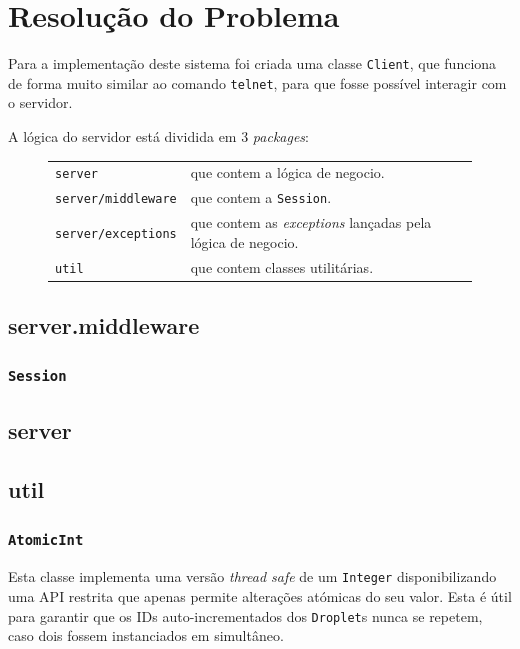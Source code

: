 \documentclass[a4paper]{article}
\begin{document}
\pagebreak
\section{Resolução do Problema}

Para a implementação deste sistema foi criada uma classe \texttt{Client}, que funciona de forma muito similar ao comando \texttt{telnet}, para que fosse possível interagir com o servidor.

A lógica do servidor está dividida em 3 \textit{packages}:

\begin{figure}[H]
    \begin{tabular}{ll}
        \texttt{server}            & que contem a lógica de negocio.\\
        \texttt{server/middleware} & que contem a \texttt{Session}.\\
        \texttt{server/exceptions} & que contem as \textit{exceptions} lançadas pela lógica de negocio.\\
        \texttt{util}              & que contem classes utilitárias.
    \end{tabular}
\end{figure}

\subsection{server.middleware}
\subsubsection{\texttt{Session}}


\subsection{server}


\subsection{util}
\subsubsection{\texttt{AtomicInt}}

Esta classe implementa uma versão \textit{thread safe} de um \texttt{Integer} disponibilizando uma API restrita que apenas permite alterações atómicas do seu valor. Esta é útil para garantir que os IDs auto-incrementados dos \texttt{Droplet}s nunca se repetem, caso dois fossem instanciados em simultâneo.
\end{document}
